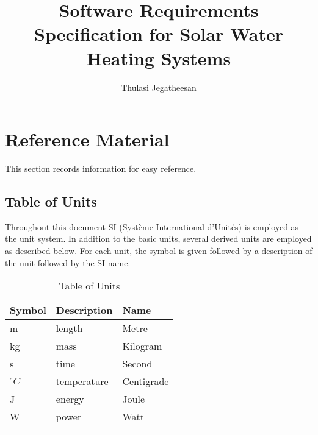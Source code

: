 \documentclass[12pt]{article}
\title{Software Requirements Specification for Solar Water Heating Systems}
\author{Thulasi Jegatheesan}
\begin{document}
\maketitle
\tableofcontents
\newpage
\section{Reference Material}
\label{Sec:RM}
This section records information for easy reference.
\subsection{Table of Units}
\label{Sec:ToU}
Throughout this document SI (Syst\`{e}me International d'Unit\'{e}s) is employed as the unit system. In addition to the basic units, several derived units are employed as described below. For each unit, the symbol is given followed by a description of the unit followed by the SI name.
\begin{longtable}{l l l}
\toprule
Symbol & Description & Name
\\
\midrule
m & length & Metre
\\
kg & mass & Kilogram
\\
s & time & Second
\\
${}^{\circ}C$ & temperature & Centigrade
\\
J & energy & Joule
\\
W & power & Watt
\\
\bottomrule
\caption{Table of Units}
\label{Table:ToU}
\end{longtable}
\end{document}
